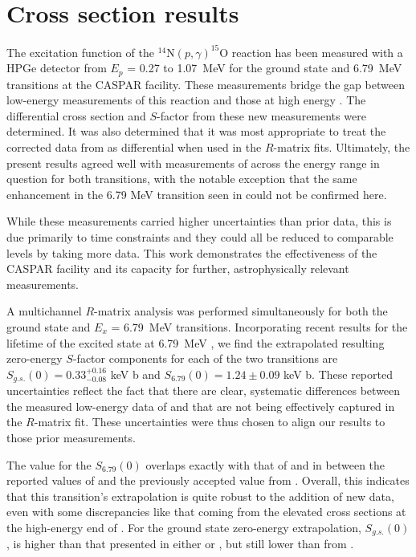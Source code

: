 \section{Cross section results}
\label{sec: csResults}

The excitation function of the $^{14}$N$(p,\gamma)^{15}$O reaction has been measured with a HPGe detector from $E_{p}$ = 0.27 to 1.07~MeV for the ground state and 6.79~MeV transitions at the CASPAR facility. These measurements bridge the gap between low-energy measurements of this reaction \cite{Formicola2004, Imbriani2005, Marta2008, Marta2011, Runkle2005} and those at high energy \cite{Schroder1987, Li2016}. The differential cross section and $S$-factor from these new measurements were determined. It was also determined that it was most appropriate to treat the corrected data from \cite{Schroder1987} as differential when used in the $R$-matrix fits. Ultimately, the present results agreed well with measurements of \cite{Schroder1987, Imbriani2005, Runkle2005, Marta2011, Li2016, Wagner2018} across the energy range in question for both transitions, with the notable exception that the same enhancement in the 6.79 MeV transition seen in \citet{Wagner2018} could not be confirmed here. 

While these measurements carried higher uncertainties than prior data, this is due primarily to time constraints and they could all be reduced to comparable levels by taking more data. This work demonstrates the effectiveness of the CASPAR facility and its capacity for further, astrophysically relevant measurements. 

A multichannel $R$-matrix analysis was performed simultaneously for both the ground state and $E_x$ = 6.79~MeV transitions. Incorporating recent results for the lifetime of the excited state at 6.79~MeV \cite{Frentz2021}, we find the extrapolated resulting zero-energy $S$-factor components for each of the two transitions are $S_{g.s.}(0) = 0.33_{-0.08}^{+0.16}$ keV b and $S_{6.79}(0) = 1.24 \pm 0.09 $ keV b. These reported uncertainties reflect the fact that there are clear, systematic differences between the measured low-energy data of \citet{Imbriani2005} and \citet{Runkle2005} that are not being effectively captured in the $R$-matrix fit. These uncertainties were thus chosen to align our results to those prior measurements. 

The value for the $S_{6.79}(0)$ overlaps exactly with that of \citet{Wagner2018} and in between the reported values of \citet{Li2016} and the previously accepted value from \citet{Adelberger2011}. Overall, this indicates that this transition's extrapolation is quite robust to the addition of new data, even with some discrepancies like that coming from the elevated cross sections at the high-energy end of \citet{Wagner2018}. For the ground state zero-energy extrapolation, $S_{g.s.}(0)$, is higher than that presented in either \citet{Wagner2018} or \citet{Adelberger2011}, but still lower than from \citet{Li2016}. 

